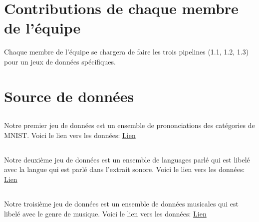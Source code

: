 \documentclass{article}
\begin{document}
\section{Contributions de chaque membre de l'équipe}
Chaque membre de l'équipe se chargera de faire les trois pipelines (1.1, 1.2, 1.3) pour un jeux de données spécifiques.\\
\section{Source de données}
\subsection{}
Notre premier jeu de données est un ensemble de prononciations des catégories de MNIST. Voici le lien vers les données: \href{https://github.com/Jakobovski/free-spoken-digit-dataset/tree/master}{Lien}\\
\subsection{}
Notre deuxième jeu de données est un ensemble de languages parlé qui est libelé avec la langue qui est parlé dans l'extrait sonore. Voici le lien vers les données: \href{https://huggingface.co/datasets/common_language}{Lien}\\
\subsection{}
Notre troisième jeu de données est un ensemble de données musicales qui est libelé avec le genre de musique. Voici le lien vers les données: \href{https://huggingface.co/datasets/marsyas/gtzan}{Lien}\\
\end{document}
